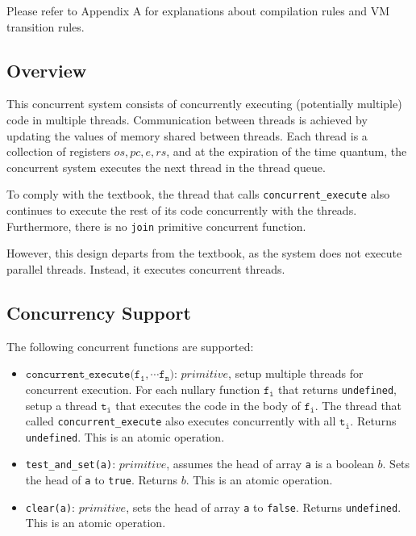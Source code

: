 Please refer to Appendix A for explanations about compilation rules and VM transition rules.

\subsection{Overview}
\label{sec:org074ba1b}
This concurrent system consists of concurrently executing (potentially multiple) code in multiple threads. Communication between threads is achieved by updating the values of memory shared between threads. Each thread is a collection of registers \(\textit{os}, \textit{pc}, \textit{e}, \textit{rs}\), and at the expiration of the time quantum, the concurrent system executes the next thread in the thread queue.

To comply with the textbook, the thread that calls \texttt{concurrent\_execute} also continues to execute the rest of its code concurrently with the threads. Furthermore, there is no \texttt{join} primitive concurrent function.

However, this design departs from the textbook, as the system does not execute parallel threads. Instead, it executes concurrent threads.

\subsection{Concurrency Support}
\label{sec:orgaa84fb2}
The following concurrent functions are supported:
\begin{itemize}
\item \(\texttt{concurrent_execute(}\texttt{f}_\texttt{1}, \cdots \texttt{f}_\texttt{n}\texttt{)}\): \(\textit{primitive}\), setup multiple threads for concurrent execution. For each nullary function \(\texttt{f}_\texttt{i}\) that returns \texttt{undefined}, setup a thread \(\texttt{t}_\texttt{i}\) that executes the code in the body of \(\texttt{f}_\texttt{i}\). The thread that called \texttt{concurrent\_execute} also executes concurrently with all \(\texttt{t}_\texttt{i}\). Returns \texttt{undefined}. This is an atomic operation.
\item \texttt{test\_and\_set(a)}: \(\textit{primitive}\), assumes the head of array \texttt{a} is a boolean \(b\). Sets the head of \texttt{a} to \texttt{true}. Returns \(b\). This is an atomic operation.
\item \texttt{clear(a)}: \(\textit{primitive}\), sets the head of array \texttt{a} to \texttt{false}. Returns \texttt{undefined}. This is an atomic operation.
\end{itemize}

